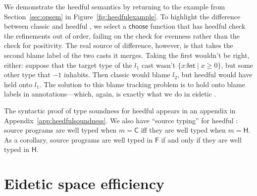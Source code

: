 \documentclass[9pt]{extarticle}
\newcommand{\ottnt}[1]{\mathit{#1}}
\newcommand{\ottsym}[1]{#1}
\begin{document}
{We demonstrate the heedful semantics by returning to the example from
Section~\ref{sec:opsem} in Figure~\ref{fig:heedfulexample}.
To highlight the difference between classic and heedful \lambdah, we
select a $ \mathsf{choose} $ function that has heedful check the refinements
out of order, failing on the check for evenness rather than the check
for positivity.
The real source of difference, however, is that  takes
the second blame label of the two casts it merges.
Taking the first wouldn't be right, either: suppose that the target
type of the $\ottnt{l_{{\mathrm{1}}}}$ cast wasn't $ \{ \mathit{x} \mathord{:}  \mathsf{Int}  \mathrel{\mid}  \mathit{x}  \mathrel{\ge}  \ottsym{0}  \} $, but some other
type that $ {-1} $ inhabits. Then classic \lambdah would blame
$\ottnt{l_{{\mathrm{2}}}}$, but heedful \lambdah would have held onto $\ottnt{l_{{\mathrm{1}}}}$.
The solution to this blame tracking problem is to hold onto blame
labels in annotations---which, again, is exactly what we do in eidetic
\lambdah.


The syntactic proof of type soundness for heedful \lambdah appears in
an appendix in Appendix~\ref{app:heedfulsoundness}.
We also have ``source typing'' for heedful \lambdah: source programs
are well typed when $\ottnt{m}  \ottsym{=}   \mathsf{C} $ iff they are well typed when
$\ottnt{m}  \ottsym{=}   \mathsf{H} $. As a corollary, source programs are well typed in $ \mathsf{F} $
if and only if they are well typed in $ \mathsf{H} $.

\fi}

\section{Eidetic space efficiency}
\label{sec:eidetic}
\end{document}
